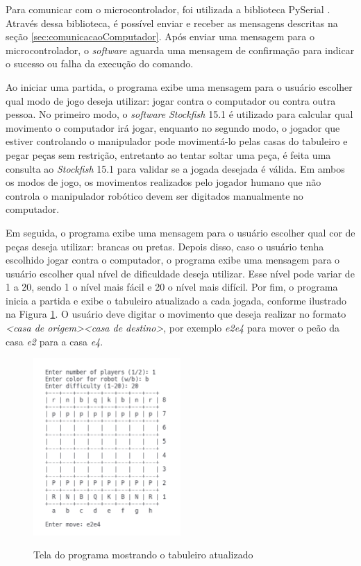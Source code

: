 Para comunicar com o microcontrolador, foi utilizada a biblioteca PySerial \cite{pyserial}.
Através dessa biblioteca, é possível enviar e receber as mensagens descritas na seção \ref{sec:comunicacaoComputador}.
Após enviar uma mensagem para o microcontrolador, o \textit{software} aguarda uma mensagem de confirmação para indicar o sucesso ou falha da execução do comando.

Ao iniciar uma partida, o programa exibe uma mensagem para o usuário escolher qual modo de jogo deseja utilizar: jogar contra o computador ou contra outra pessoa.
No primeiro modo, o \textit{software} \textit{Stockfish} 15.1 é utilizado para calcular qual movimento o computador irá jogar, 
enquanto no segundo modo, o jogador que estiver controlando o manipulador pode movimentá-lo pelas casas do tabuleiro e pegar peças sem restrição, entretanto ao tentar soltar uma peça, é feita uma consulta ao \textit{Stockfish} 15.1 para validar se a jogada desejada é válida.
Em ambos os modos de jogo, os movimentos realizados pelo jogador humano que não controla o manipulador robótico devem ser digitados manualmente no computador.

Em seguida, o programa exibe uma mensagem para o usuário escolher qual cor de peças deseja utilizar: brancas ou pretas.
Depois disso, caso o usuário tenha escolhido jogar contra o computador, o programa exibe uma mensagem para o usuário escolher qual nível de dificuldade deseja utilizar.
Esse nível pode variar de 1 a 20, sendo 1 o nível mais fácil e 20 o nível mais difícil.
Por fim, o programa inicia a partida e exibe o tabuleiro atualizado a cada jogada, conforme ilustrado na Figura \ref{fig:softwareTabuleiro}.
O usuário deve digitar o movimento que deseja realizar no formato \textit{<casa de origem><casa de destino>}, por exemplo \textit{e2e4} para mover o peão da casa \textit{e2} para a casa \textit{e4}.

\begin{figure}[H]
    \centering
    \caption{Tela do programa mostrando o tabuleiro atualizado}
    \includegraphics[keepaspectratio=true, width=0.5\textwidth]
    	{img/software-tabuleiro.png}
    \label{fig:softwareTabuleiro}
\end{figure}

